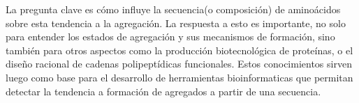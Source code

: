% 




























La pregunta clave es cómo influye la secuencia(o composición) de aminoácidos sobre esta tendencia a la agregación.
La respuesta a esto es importante, no solo para entender los estados de agregación y sus mecanismos de formación, sino también para otros aspectos como la producción biotecnológica de proteínas, o el diseño racional de cadenas polipeptídicas funcionales.
Estos conocimientos sirven luego como base para el desarrollo de herramientas bioinformaticas que permitan detectar la tendencia a formación de agregados a partir de una secuencia.

